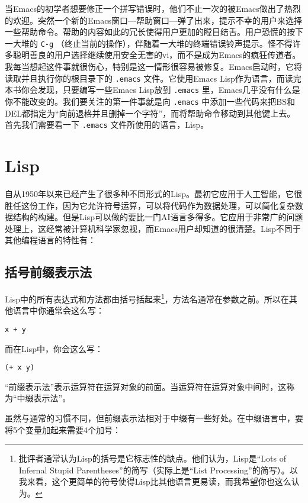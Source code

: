 当Emacs的初学者想要修正一个拼写错误时，他们不止一次的被Emacs做出了热烈的欢迎。突然一个新的Emacs窗口---帮助窗口---弹了出来，提示不幸的用户来选择一些帮助命令。帮助的内容如此的冗长使得用户更加的瞠目结舌。用户恐慌的按下一大堆的 \verb|C-g| （终止当前的操作），伴随着一大堆的终端错误铃声提示。怪不得许多聪明善良的用户选择继续使用安全无害的vi，而不是成为Emacs的疯狂传道者。我每当想起这件事就很伤心，特别是这一情形很容易被修复。Emacs启动时，它将读取并且执行你的根目录下的 \verb|.emacs| 文件。它使用Emacs Lisp作为语言，而读完本书你会发现，只要编写一些Emacs Lisp放到 \verb|.emacs| 里，Emacs几乎没有什么是你不能改变的。我们要关注的第一件事就是向 \verb|.emacs| 中添加一些代码来把BS和DEL都指定为“向前退格并且删掉一个字符”，而将帮助命令移动到其他键上去。首先我们需要看一下 \verb|.emacs| 文件所使用的语言，Lisp。

\section{Lisp}
\label{section:01-Lisp}

自从1950年以来已经产生了很多种不同形式的Lisp。最初它应用于人工智能，它很胜任这份工作，因为它允许符号运算，可以将代码作为数据处理，可以简化复杂数据结构的构建。但是Lisp可以做的要比一门AI语言多得多。它应用于非常广的问题处理上，这经常被计算机科学家忽视，而Emacs用户却知道的很清楚。Lisp不同于其他编程语言的特性有：

\subsection{括号前缀表示法}
\label{section:01-Fully-parenthesized-prefix-notation}

Lisp中的所有表达式和方法都由括号括起来\footnote{批评者通常认为Lisp的括号是它标志性的缺点。他们认为，Lisp是“Lots of Infernal Stupid Parentheses”的简写（实际上是“List Processing”的简写）。以我来看，这个更简单的符号使得Lisp比其他语言更易读，而我希望你也这么认为。}，方法名通常在参数之前。所以在其他语言中你通常会这么写：

\begin{verbatim}
x + y
\end{verbatim}

而在Lisp中，你会这么写：

\begin{verbatim}
(+ x y)
\end{verbatim}

“前缀表示法”表示运算符在运算对象的前面。当运算符在运算对象中间时，这称为“中缀表示法”。

虽然与通常的习惯不同，但前缀表示法相对于中缀有一些好处。在中缀语言中，要将5个变量加起来需要4个加号：

